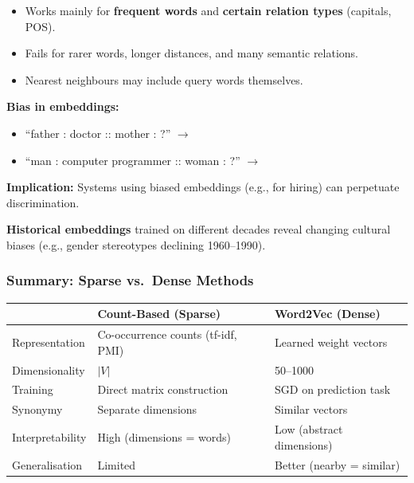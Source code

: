 \begin{tipbox}
\begin{itemize}
  \item Works mainly for \textbf{frequent words} and \textbf{certain relation types} (capitals, POS).
  \item Fails for rarer words, longer distances, and many semantic relations.
  \item Nearest neighbours may include query words themselves.
\end{itemize}
\end{tipbox}

\separator

\textbf{Bias in embeddings:}

\begin{tipbox}
\begin{itemize}
  \item ``father : doctor :: mother : ?'' $\to$ 
  \item ``man : computer programmer :: woman : ?'' $\to$ 
\end{itemize}

\textbf{Implication:} Systems using biased embeddings (e.g., for hiring) can perpetuate discrimination.

\textbf{Historical embeddings} trained on different decades reveal changing cultural biases (e.g., gender stereotypes declining 1960--1990).
\end{tipbox}

\bigseparator

\subsubsection{Summary: Sparse vs.\ Dense Methods}

\begin{center}
\renewcommand{\arraystretch}{1.3}
\begin{tabular}{@{} l p{5.5cm} p{5.5cm} @{}}
\toprule
 & \textbf{Count-Based (Sparse)} & \textbf{Word2Vec (Dense)} \\
\midrule
Representation & Co-occurrence counts (tf-idf, PMI) & Learned weight vectors \\
Dimensionality & $|V|$ & 50--1000 \\
Training & Direct matrix construction & SGD on prediction task \\
Synonymy & Separate dimensions & Similar vectors \\
Interpretability & High (dimensions = words) & Low (abstract dimensions) \\
Generalisation & Limited & Better (nearby = similar) \\
\bottomrule
\end{tabular}
\end{center}
